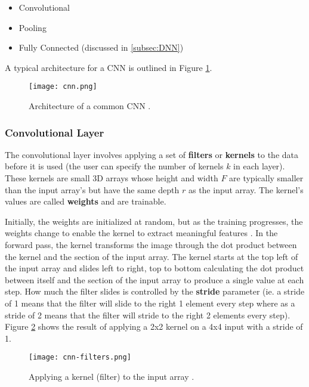 \begin{itemize}
    \item Convolutional
    \item Pooling
    \item Fully Connected (discussed in \ref{subsec:DNN})
\end{itemize}

A typical architecture for a CNN is outlined in Figure \ref{fig:cnn-architecture}. 

\begin{figure}[ht]
    \centering
    \texttt{[image: cnn.png]}
    \caption{Architecture of a common CNN \cite{tayeTheoreticalUnderstandingConvolutional2023}.}
    \label{fig:cnn-architecture}
\end{figure}

\subsubsection{Convolutional Layer}
The convolutional layer involves applying a set of \textbf{filters} or \textbf{kernels} to the data before it is used (the user can specify the number of kernels $k$ in each layer). These kernels are small 3D arrays whose height and width $F$ are typically smaller than the input array's but have the same depth $r$ as the input array. The kernel's values are called \textbf{weights} and are trainable. 

Initially, the weights are initialized at random, but as the training progresses, the weights change to enable the kernel to extract meaningful features \cite{tayeTheoreticalUnderstandingConvolutional2023}. In the forward pass, the kernel transforms the image through the dot product between the kernel and the section of the input array. The kernel starts at the top left of the input array and slides left to right, top to bottom calculating the dot product between itself and the section of the input array to produce a single value at each step. How much the filter slides is controlled by the \textbf{stride} parameter (ie. a stride of 1 means that the filter will slide to the right 1 element every step where as a stride of 2 means that the filter will stride to the right 2 elements every step). Figure \ref{fig:cnn-filters} shows the result of applying a 2x2 kernel on a 4x4 input with a stride of 1.

\begin{figure}[ht]
    \centering
    \texttt{[image: cnn-filters.png]}
    \caption{Applying a kernel (filter) to the input array \cite{tayeTheoreticalUnderstandingConvolutional2023}.}
    \label{fig:cnn-filters}
\end{figure}



